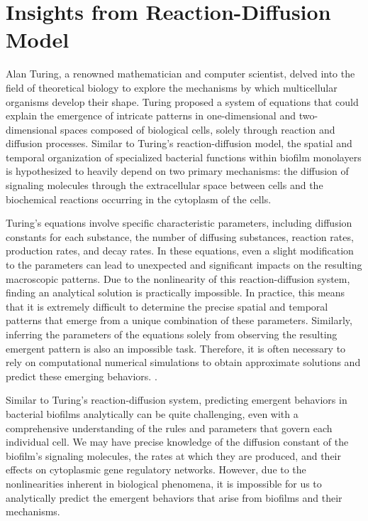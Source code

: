 \section{Insights from Reaction-Diffusion Model}

Alan Turing, a renowned mathematician and computer scientist, delved into the field of theoretical biology to explore the mechanisms by which multicellular organisms develop their shape. Turing proposed a system of equations that could explain the emergence of intricate patterns in one-dimensional and two-dimensional spaces composed of biological cells, solely through reaction and diffusion processes. Similar to Turing's reaction-diffusion model, the spatial and temporal organization of specialized bacterial functions within biofilm monolayers is hypothesized to heavily depend on two primary mechanisms: the diffusion of signaling molecules through the extracellular space between cells and the biochemical reactions occurring in the cytoplasm of the cells.

Turing's equations involve specific characteristic parameters, including diffusion constants for each substance, the number of diffusing substances, reaction rates, production rates, and decay rates. In these equations, even a slight modification to the parameters can lead to unexpected and significant impacts on the resulting macroscopic patterns. Due to the nonlinearity of this reaction-diffusion system, finding an analytical solution is practically impossible. In practice, this means that it is extremely difficult to determine the precise spatial and temporal patterns that emerge from a unique combination of these parameters. Similarly, inferring the parameters of the equations solely from observing the resulting emergent pattern is also an impossible task. Therefore, it is often necessary to rely on computational numerical simulations to obtain approximate solutions and predict these emerging behaviors. {\footnotesize\cite{turing}\cite{Landge2020}}.

Similar to Turing's reaction-diffusion system, predicting emergent behaviors in bacterial biofilms analytically can be quite challenging, even with a comprehensive understanding of the rules and parameters that govern each individual cell. We may have precise knowledge of the diffusion constant of the biofilm's signaling molecules, the rates at which they are produced, and their effects on cytoplasmic gene regulatory networks. However, due to the nonlinearities inherent in biological phenomena, it is impossible for us to analytically predict the emergent behaviors that arise from biofilms and their mechanisms.

